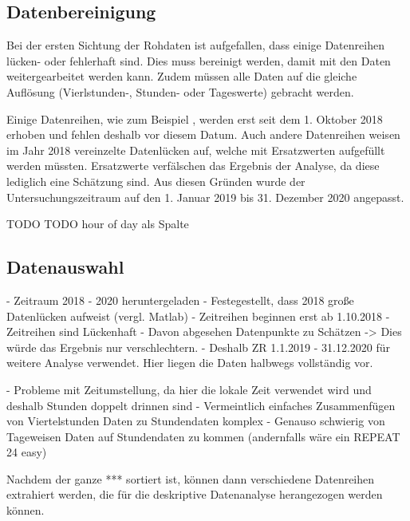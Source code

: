 \subsection{Datenbereinigung}
Bei der ersten Sichtung der Rohdaten ist aufgefallen, dass einige Datenreihen lücken- oder fehlerhaft sind. Dies muss bereinigt werden, damit mit den Daten weitergearbeitet werden kann. Zudem müssen alle Daten auf die gleiche Auflösung (Vierlstunden-, Stunden- oder Tageswerte) gebracht werden.


Einige Datenreihen, wie zum Beispiel , werden erst seit dem 1. Oktober 2018 erhoben und fehlen deshalb vor diesem Datum. Auch andere Datenreihen weisen im Jahr 2018 vereinzelte Datenlücken auf, welche mit Ersatzwerten aufgefüllt werden müssten. Ersatzwerte verfälschen das Ergebnis der Analyse, da diese lediglich eine Schätzung sind. Aus diesen Gründen wurde der Untersuchungszeitraum auf den 1. Januar 2019 bis 31. Dezember 2020 angepasst.

TODO
TODO hour of day als Spalte

\subsection{Datenauswahl}


- Zeitraum 2018 - 2020 heruntergeladen
- Festegestellt, dass 2018 große Datenlücken aufweist (vergl. Matlab)
  - Zeitreihen beginnen erst ab 1.10.2018
  - Zeitreihen sind Lückenhaft
- Davon abgesehen Datenpunkte zu Schätzen -> Dies würde das Ergebnis nur verschlechtern.
- Deshalb ZR 1.1.2019 - 31.12.2020 für weitere Analyse verwendet. Hier liegen die Daten halbwegs vollständig vor.

- Probleme mit Zeitumstellung, da hier die lokale Zeit verwendet wird und deshalb Stunden doppelt drinnen sind
  - Vermeintlich einfaches Zusammenfügen von Viertelstunden Daten zu Stundendaten komplex
  - Genauso schwierig von Tageweisen Daten auf Stundendaten zu kommen (andernfalls wäre ein REPEAT 24 easy)

Nachdem der ganze *** sortiert ist, können dann verschiedene Datenreihen extrahiert werden, die für die deskriptive Datenanalyse herangezogen werden können. 
